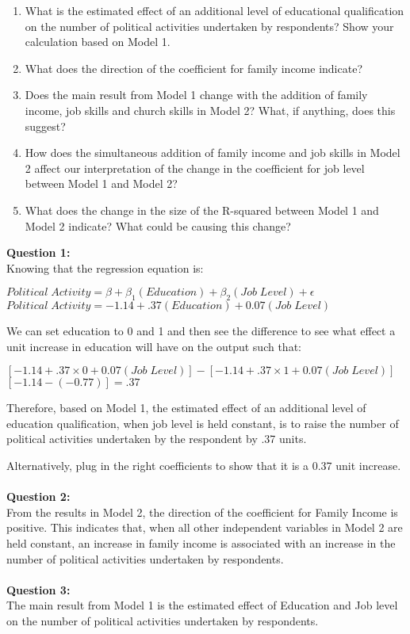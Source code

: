 \documentclass[12pt, letterpaper]{article}
\begin{document}
\begin{center}
\begin{enumerate}
	\item What is the estimated effect of an additional level of educational qualification on the number of political activities undertaken by respondents? Show your calculation based on Model 1.
	\item What does the direction of the coefficient for family income indicate?
	\item Does the main result from Model 1 change with the addition of family income, job skills and church skills in Model 2? What, if anything, does this suggest?
	\item How does the simultaneous addition of family income and job skills in Model 2 affect our interpretation of the change in the coefficient for job level between Model 1 and Model 2?
	\item What does the change in the size of the R-squared between Model 1 and Model 2 indicate? What could be causing this change?
\end{enumerate}
\end{center}
\newpage
\noindent\textbf{Question 1:}\\
Knowing that the regression equation is:
\begin{center}
	$Political\;Activity = \beta + \beta _1(Education) + \beta _2(Job\;Level) + \epsilon$
\\	$Political\;Activity = -1.14 + .37(Education) + 0.07(Job\;Level)$
\end{center}
We can set education to 0 and 1 and then see the difference to see what effect a unit increase in education will have on the output such that:
\begin{center}
	$[-1.14 + .37\times0 + 0.07(Job\;Level)] - [-1.14 + .37\times1 + 0.07(Job\;Level)]$\\
	$[-1.14 -(-0.77)]=.37$
\end{center}
Therefore, based on Model 1, the estimated effect of an additional level of education qualification, when job level is held constant, is to raise the number of political activities undertaken by the respondent by .37 units.

Alternatively, plug in the right coefficients to show that it is a 0.37 unit increase.
\\\\
\textbf{Question 2:}\\
From the results in Model 2, the direction of the coefficient for Family Income is positive. This indicates that, when all other independent variables in Model 2 are held constant, an increase in family income is associated with an increase in the number of political activities undertaken by respondents.
\\\\
\textbf{Question 3:}\\
The main result from Model 1 is the estimated effect of Education and Job level on the number of political activities undertaken by respondents.
\end{document}
